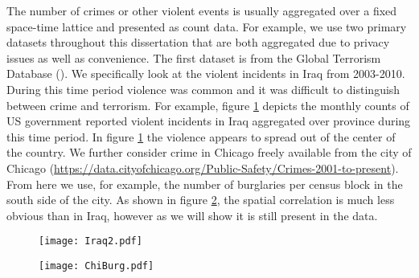 \documentclass[11pt]{isuthesis}
\begin{document}
The number of crimes or other violent events is usually aggregated over a fixed space-time lattice and presented as count data.  For example, we use two primary datasets throughout this dissertation that are both aggregated due to privacy issues as well as convenience.  The first dataset is from the Global Terrorism Database (\cite{lafree2007introducing}).  We specifically look at the violent incidents in Iraq from 2003-2010.  During this time period violence was common and it was difficult to distinguish between crime and terrorism.  For example, figure \ref{IZSpread} depicts the monthly counts of US government reported violent incidents in Iraq aggregated over province during this time period.  In figure \ref{IZSpread} the violence appears to spread out of the center of the country.  We further consider crime in Chicago freely available from the city of Chicago (\href{https://data.cityofchicago.org/Public-Safety/Crimes-2001-to-present}{https://data.cityofchicago.org/Public-Safety/Crimes-2001-to-present}).  From here we use, for example, the number of burglaries per census block in the south side of the city.  As shown in figure \ref{ChiSpread}, the spatial correlation is much less obvious than in Iraq, however as we will show it is still present in the data.

\begin{figure}[h] %
	\begin{center}
		\vspace{6pc}
		\texttt{[image: Iraq2.pdf]}
		\label{IZSpread}
	\end{center}
\end{figure} 



\begin{figure}[h] %
	\begin{center}
		\vspace{6pc}
		\texttt{[image: ChiBurg.pdf]}
		\label{ChiSpread}
	\end{center}
\end{figure} 
\end{document}
